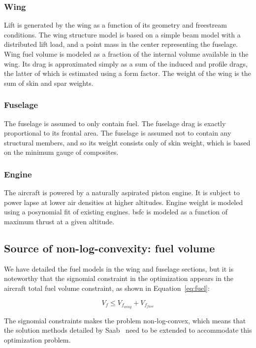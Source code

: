 \subsubsection{Wing}

Lift is generated by the wing as a function of its geometry and freestream conditions.
The wing structure model is based on a simple beam model with a distributed lift load,
and a point mass in the center representing the fuselage.
Wing fuel volume is modeled as a fraction of the internal volume available in the wing.
Its drag is
approximated simply as a sum of the induced and profile drags, the latter of which is estimated using a
form factor. The weight of the wing is the sum of skin and spar weights.

\subsubsection{Fuselage}

The fuselage is assumed to only contain fuel. The fuselage drag is exactly proportional to its frontal area.
The fuselage is assumed not to contain any structural members, and so its weight consists only of skin weight, which
is based on the minimum gauge of composites.

\subsubsection{Engine}

The aircraft is powered by a naturally aspirated piston engine. It is subject to
power lapse at lower air densities at higher altitudes. Engine weight is modeled using a posynomial fit of existing
engines. \gls{bsfc} is modeled as a function of maximum thrust at a given altitude.

\subsection{Source of non-log-convexity: fuel volume}
We have detailed the fuel models in the wing and fuselage sections, but it is noteworthy that
the signomial constraint in the optimization appears in the aircraft total fuel volume constraint,
as shown in Equation~\ref{eq:fuel}:

\begin{equation}
\label{eq:fuel}
V_f \leq V_{f_{wing}} + V_{f_{fuse}} 
\end{equation}

The signomial constraints makes the problem non-log-convex, which means that the solution methods
detailed by Saab~\cite{Saab2018} need to be extended to accommodate this optimization problem.
